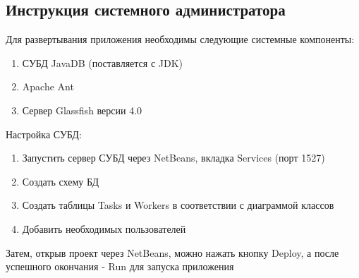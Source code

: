 \subsection{Инструкция системного администратора}
Для развертывания приложения необходимы следующие  системные компоненты:
\begin{enumerate}
	\item СУБД JavaDB (поставляется с JDK)
	\item Apache Ant
	\item Сервер Glassfish версии 4.0
\end{enumerate}
Настройка СУБД:
\begin{enumerate}
	\item Запустить сервер СУБД через NetBeans, вкладка Services (порт 1527)
	\item Создать схему БД
	\item Создать таблицы Tasks и Workers в соответствии с диаграммой классов
	\item Добавить необходимых пользователей
\end{enumerate}
Затем, открыв проект через NetBeans, можно нажать кнопку Deploy, а после успешного окончания - Run для запуска приложения